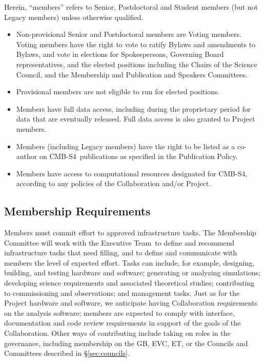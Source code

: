 \documentclass[12pt]{article}
\newcommand{\exec}{{Executive Team}}
\newcommand\collabname{CMB-S4}
\begin{document}
Herein, ``members'' refers to Senior, Postdoctoral and Student members (but not Legacy members) unless otherwise qualified.

\begin{itemize}

\item Non-provisional Senior and Postdoctoral members are Voting members.  Voting members have the right to vote to ratify Bylaws and amendments to Bylaws, and vote in elections for Spokespersons, Governing Board representatives, and the elected positions including the Chairs of the Science Council, and the Membership and Publication and Speakers Committees.

\item Provisional members are not eligible to run for elected positions.

\item Members have full data access, including during the proprietary period for data that are eventually released. Full data access is also granted to Project members.

\item Members (including Legacy members) have the right to be listed as a co-author on \collabname\ publications as specified in the Publication Policy.

\item Members have access to computational resources designated for \collabname, according to any policies of the Collaboration and/or Project.

\end{itemize}

\subsection{Membership Requirements}

Members must commit effort to approved infrastructure tasks. The Membership Committee will work with the \exec\ to define and recommend infrastructure tasks that need filling, and to define and communicate with members the level of expected effort. Tasks can include, for example, designing, building, and testing hardware and software; generating or analyzing simulations; developing science requirements and associated theoretical studies; contributing to commissioning and observations; and management tasks. Just as for the Project hardware and software, we anticipate having Collaboration requirements on the analysis software; members are expected to comply with interface, documentation and code review requirements in support of the goals of the Collaboration. Other ways of contributing include taking on roles in the governance, including membership on the GB, EVC, ET, or the Councils and Committees described in \S\ref{sec:councils}.
\end{document}
